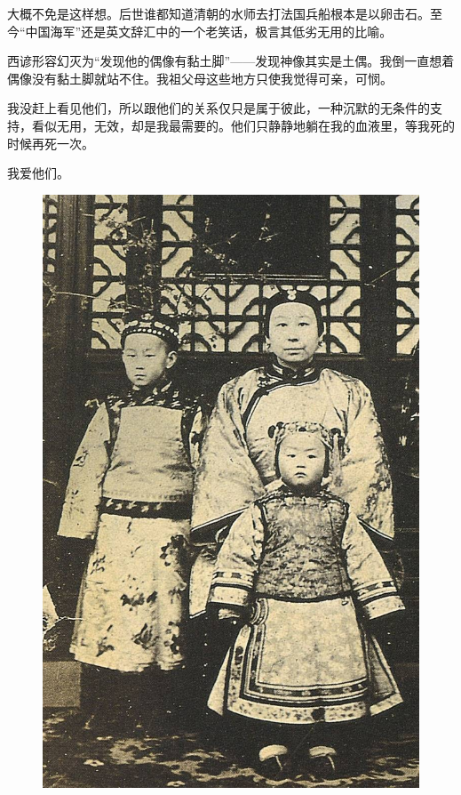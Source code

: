 \par 大概不免是这样想。后世谁都知道清朝的水师去打法国兵船根本是以卵击石。至今“中国海军”还是英文辞汇中的一个老笑话，极言其低劣无用的比喻。
\par 西谚形容幻灭为“发现他的偶像有黏土脚”——发现神像其实是土偶。我倒一直想着偶像没有黏土脚就站不住。我祖父母这些地方只使我觉得可亲，可悯。
\par 我没赶上看见他们，所以跟他们的关系仅只是属于彼此，一种沉默的无条件的支持，看似无用，无效，却是我最需要的。他们只静静地躺在我的血液里，等我死的时候再死一次。
\par 我爱他们。
\begin{figure}[htb]
    \centering %
    \includegraphics[scale=0.4]{picture/对照记25.jpeg}
\end{figure}

